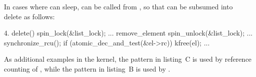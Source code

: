 In cases where  can sleep,  can be called from
, so that  can be subsumed into delete as follows:

\begin{VerbatimU}
    4.
    delete()
    {
        spin_lock(&list_lock);
        ...
        remove_element
        spin_unlock(&list_lock);
        ...
        synchronize_rcu();
        if (atomic_dec_and_test(&el->rc))
            kfree(el);
        ...
    }
\end{VerbatimU}

As additional examples in the kernel, the pattern in listing~C is used by
reference counting of , while the pattern in listing~B is used by
.
